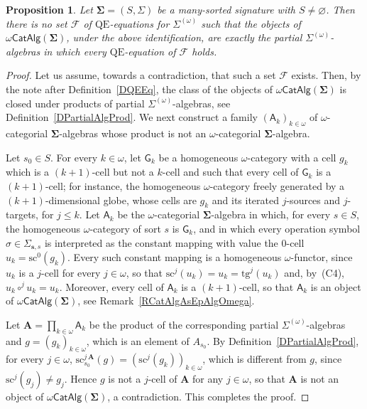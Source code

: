 \documentclass[a4paper, reqno]{amsbook}
\newcommand{\sig}[1]{\mathbf{#1}}             %
\newcommand{\calg}[1]{\boldsymbol{\mathsf{#1}}} %
\newcommand{\QE}{\mathrm{QE}}
\newcommand{\src}{\mathrm{sc}}
\newcommand{\tgt}{\mathrm{tg}}
\theoremstyle{plain}
\newtheorem{proposition}[theorem]{Proposition}
\theoremstyle{definition}
\begin{document}
\begin{proposition}\label{PFiniteDimNotQE}
Let $\sig{\Sigma}=(S,\Sigma)$ be a many-sorted signature with $S\neq\varnothing$.
Then there is no set $\mathcal{F}$ of $\QE$-equations for $\Sigma^{(\omega)}$ such that the objects of $\omega\mathsf{CatAlg}(\sig{\Sigma})$, under the above identification, are exactly the partial $\Sigma^{(\omega)}$-algebras in which every $\QE$-equation of $\mathcal{F}$ holds.
\end{proposition}
\begin{proof}
Let us assume, towards a contradiction, that such a set $\mathcal{F}$ exists.
Then, by the note after Definition~\ref{DQEEq}, the class of the objects of $\omega\mathsf{CatAlg}(\sig{\Sigma})$ is closed under products of partial $\Sigma^{(\omega)}$-algebras, see Definition~\ref{DPartialAlgProd}.
We next construct a family $(\calg{A}_{k})_{k\in\omega}$ of $\omega$-categorial $\sig{\Sigma}$-algebras whose product is not an $\omega$-categorial $\sig{\Sigma}$-algebra.

Let $s_{0}\in S$.
For every $k\in\omega$, let $\mathsf{G}_{k}$ be a homogeneous $\omega$-category with a cell $g_{k}$ which is a $(k+1)$-cell but not a $k$-cell and such that every cell of $\mathsf{G}_{k}$ is a $(k+1)$-cell; for instance, the homogeneous $\omega$-category freely generated by a $(k+1)$-dimensional globe, whose cells are $g_{k}$ and its iterated $j$-sources and $j$-targets, for $j\leq k$.
Let $\calg{A}_{k}$ be the $\omega$-categorial $\sig{\Sigma}$-algebra in which, for every $s\in S$, the homogeneous $\omega$-category of sort $s$ is $\mathsf{G}_{k}$, and in which every operation symbol $\sigma\in\Sigma_{\mathbf{s},s}$ is interpreted as the constant mapping with value the $0$-cell $u_{k}=\src^{0}(g_{k})$.
Every such constant mapping is a homogeneous $\omega$-functor, since $u_{k}$ is a $j$-cell for every $j\in\omega$, so that $\src^{j}(u_{k})=u_{k}=\tgt^{j}(u_{k})$ and, by~(C4), $u_{k}\circ^{j}u_{k}=u_{k}$.
Moreover, every cell of $\calg{A}_{k}$ is a $(k+1)$-cell, so that $\calg{A}_{k}$ is an object of $\omega\mathsf{CatAlg}(\sig{\Sigma})$, see Remark~\ref{RCatAlgAsEpAlgOmega}.

Let $\mathbf{A}=\prod_{k\in\omega}\calg{A}_{k}$ be the product of the corresponding partial $\Sigma^{(\omega)}$-algebras and $g=(g_{k})_{k\in\omega}$, which is an element of $A_{s_{0}}$.
By Definition~\ref{DPartialAlgProd}, for every $j\in\omega$, $\src^{j\,\mathbf{A}}_{s_{0}}(g)=(\src^{j}(g_{k}))_{k\in\omega}$, which is different from $g$, since $\src^{j}(g_{j})\neq g_{j}$.
Hence $g$ is not a $j$-cell of $\mathbf{A}$ for any $j\in\omega$, so that $\mathbf{A}$ is not an object of $\omega\mathsf{CatAlg}(\sig{\Sigma})$, a contradiction. This completes the proof.
\end{proof}
\end{document}
